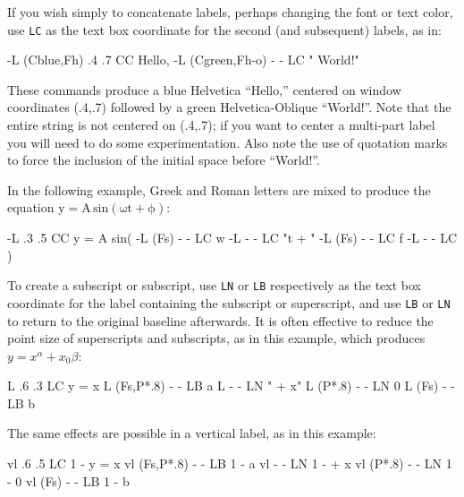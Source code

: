 \documentclass{book}
\begin{document}
%
%
If you wish simply to concatenate labels, perhaps changing the font or
text color, use {\tt LC} as the text box coordinate for the second
(and subsequent) labels, as in:
\begin{center}
\begin{boxedverbatim}
-L (Cblue,Fh) .4 .7 CC Hello,
-L (Cgreen,Fh-o) - - LC " World!"
\end{boxedverbatim}
\end{center}
These commands produce a blue Helvetica ``Hello,'' centered on window
coordinates (.4,.7) followed by a green Helvetica-Oblique ``World!''.
Note that the entire string is not centered on (.4,.7);  if you want
to center a multi-part label you will need to do some experimentation.
Also note the use of quotation marks to force the inclusion of the
initial space before ``World!''.

In the following example, Greek and Roman letters are mixed to produce
the equation $\mathrm{y = A\, sin ( \omega t + \phi )}$:
\begin{center}
\begin{boxedverbatim}
-L .3 .5 CC y = A sin(
-L (Fs) - - LC w
-L - - LC "t + "
-L (Fs) - - LC f
-L - - LC )
\end{boxedverbatim}
\end{center}

%
%
%
%
%
%
To create a subscript or subscript, use {\tt LN} or {\tt LB}
respectively as the text box coordinate for the label containing the
subscript or superscript, and use {\tt LB} or {\tt LN} to return to
the original baseline afterwards.  It is often effective to reduce the
point size of superscripts and subscripts, as in this example, which produces
$y = x^{\alpha} + x_{0}{\beta}$:
\begin{center}
\begin{boxedverbatim}
L .6 .3 LC y = x
L (Fs,P*.8) - - LB a
L - - LN " + x"
L (P*.8) - - LN 0
L (Fs) - - LB b
\end{boxedverbatim}
\end{center}
The same effects are possible in a vertical label, as in this example:
\begin{center}
\begin{boxedverbatim}
vl .6 .5 LC 1 -
y = x
vl (Fs,P*.8) - - LB 1 -
a
vl - - LN 1 -
 + x
vl (P*.8) - - LN 1 -
0
vl (Fs) - - LB 1 -
b
\end{boxedverbatim}
\end{center}
\end{document}
